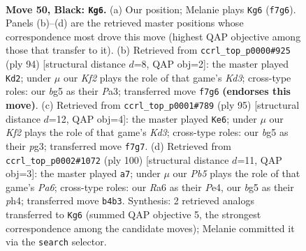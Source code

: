 \documentclass[11pt]{article}
\begin{document}
\clearpage

\begin{figure}[p]\centering
\begin{subfigure}{0.46\textwidth}\centering
\resizebox{\linewidth}{!}{%
\newchessgame
\chessboard[
  setfen={2R5/5k1r/rp6/6B1/1p1P4/3K4/8/8 b - - 4 50},
  showmover=false,
  pgfstyle=straightmove, color=movearrow, markmove={f7-g6}
]}
\caption{}
\end{subfigure}\hfill
\begin{subfigure}{0.46\textwidth}\centering
\resizebox{\linewidth}{!}{%
\newchessgame
\chessboard[
  setfen={8/8/8/6kp/8/P2K1R1P/8/2r5 w - - 6 48},
  showmover=false,
  pgfstyle=straightmove, color=movearrow, markmove={d3-d2}
]}
\caption{}
\end{subfigure}
\\[4pt]
\begin{subfigure}{0.46\textwidth}\centering
\resizebox{\linewidth}{!}{%
\newchessgame
\chessboard[
  setfen={8/7R/3k1rp1/1p6/7P/2K3P1/8/8 b - - 0 48},
  showmover=false,
  pgfstyle=straightmove, color=movearrow, markmove={d6-e6}
]}
\caption{}
\end{subfigure}\hfill
\begin{subfigure}{0.46\textwidth}\centering
\resizebox{\linewidth}{!}{%
\newchessgame
\chessboard[
  setfen={1r6/8/P4p1k/R1K5/4Pp1p/8/8/8 w - - 5 51},
  showmover=false,
  pgfstyle=straightmove, color=movearrow, markmove={a6-a7}
]}
\caption{}
\end{subfigure}
\caption{\textbf{Move 50, Black: \texttt{Kg6}.} (a) Our position; Melanie plays \texttt{Kg6} (\texttt{f7g6}). Panels (b)--(d) are the retrieved master positions whose correspondence most drove this move (highest QAP objective among those that transfer to it). (b) Retrieved from \texttt{ccrl\_top\_p0000\#925} (ply 94) [structural distance $d$=8, QAP obj=2]: the master played \texttt{Kd2}; under $\mu$ our \emph{Kf2} plays the role of that game's \emph{Kd3}; cross-type roles: our \emph{b}g5 as their \emph{P}a3; transferred move \texttt{f7g6} \textbf{(endorses this move)}. (c) Retrieved from \texttt{ccrl\_top\_p0001\#789} (ply 95) [structural distance $d$=12, QAP obj=4]: the master played \texttt{Ke6}; under $\mu$ our \emph{Kf2} plays the role of that game's \emph{Kd3}; cross-type roles: our \emph{b}g5 as their \emph{p}g3; transferred move \texttt{f7g7}. (d) Retrieved from \texttt{ccrl\_top\_p0002\#1072} (ply 100) [structural distance $d$=11, QAP obj=3]: the master played \texttt{a7}; under $\mu$ our \emph{Pb5} plays the role of that game's \emph{Pa6}; cross-type roles: our \emph{R}a6 as their \emph{P}e4, our \emph{b}g5 as their \emph{p}h4; transferred move \texttt{b4b3}. Synthesis: 2 retrieved analogs transferred to \texttt{Kg6} (summed QAP objective 5, the strongest correspondence among the candidate moves); Melanie committed it via the \texttt{search} selector.}
\label{fig:thought-m99}
\end{figure}
\end{document}
